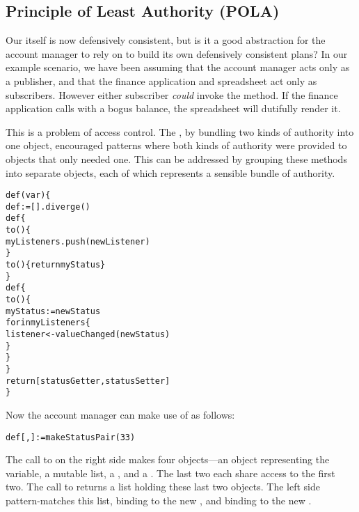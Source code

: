 \documentclass{llncs}
\begin{document}

\subsection{Principle of Least Authority (POLA)}

Our  itself is now defensively consistent, but is
it a good abstraction for the account manager to rely on to build its
own defensively consistent plans? In our example scenario, we have
been assuming that the account manager acts only as a publisher, and
that the finance application and spreadsheet act only as
subscribers. However either subscriber \emph{could} invoke the
 method. If the finance application calls
 with a bogus balance, the spreadsheet will dutifully
render it.

This is a problem of access control. The , by
bundling two kinds of authority into one object, encouraged patterns
where both kinds of authority were provided to objects that only
needed one. This can be addressed by grouping these methods into
separate objects, each of which represents a sensible bundle of
authority.
%
\begin{alltt}
    def (var ) \{
        def  := [].diverge()
        def  \{
            to () \{
                myListeners.push(newListener)
            \}
            to () \{ return myStatus \}
        \}
        def  \{
            to () \{
                myStatus := newStatus
                for  in myListeners \{
                    listener <- valueChanged(newStatus)
                \}
            \}
        \}
        return [statusGetter, statusSetter]
    \}
\end{alltt}
%
Now the account manager can make use of  as
follows:
%
\begin{alltt}
    def [, ] := makeStatusPair(33)
\end{alltt}
%
The call to  on the right side makes four
objects---an object representing the  variable, a
mutable  list, a , and a
. The last two each share access to the first
two. The call to  returns a list holding these
last two objects. The left side pattern-matches this list, binding
 to the new , and binding 
to the new .
\end{document}
